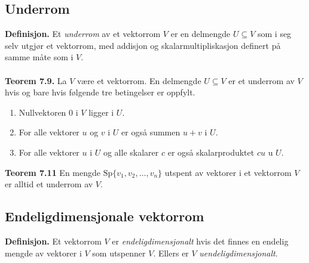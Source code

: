 \documentclass{article}
\begin{document}
\subsection{Underrom}
\textbf{Definisjon.} Et \textit{underrom} av et vektorrom $V$ er en delmengde $U \subseteq V$ som i seg selv utgjør et vektorrom, med addisjon og skalarmultipliskasjon definert på samme måte som i $V$.
\\\\
\textbf{Teorem 7.9.} La $V$ være et vektorrom. En delmengde $U \subseteq V$ er et underrom av $V$ hvis og bare hvis følgende tre betingelser er oppfylt.
\begin{enumerate}
    \item Nullvektoren $0$ i $V$ ligger i $U$.
    \item For alle vektorer $u$ og $v$ i $U$ er også summen $u + v$ i $U$.
    \item For alle vektorer $u$ i $U$ og alle skalarer $c$ er også skalarproduktet $cu$ u $U$.
\end{enumerate}
\textbf{Teorem 7.11} En mengde $\text{Sp}\{v_1, v_2, \dots, v_n\}$ utspent av vektorer i et vektorrom $V$ er alltid et underrom av $V$.


\subsection{Endeligdimensjonale vektorrom}
\textbf{Definisjon.} Et vektorrom $V$ er \textit{endeligdimensjonalt} hvis det finnes en endelig mengde av vektorer i $V$ som utspenner $V$. Ellers er $V$ \textit{uendeligdimensjonalt}.
\end{document}
